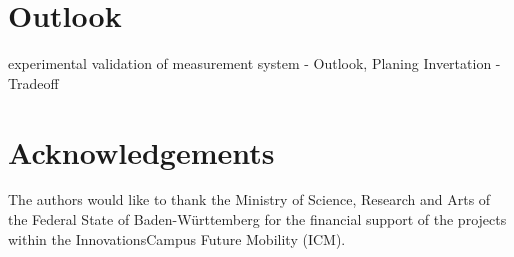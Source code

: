 \documentclass[5p,times,procedia]{elsarticle}
\begin{document}
\section{Outlook}
experimental validation of measurement system
- Outlook, Planing Invertation
- Tradeoff



%

\section*{Acknowledgements}
The authors would like to thank the Ministry of Science, Research and Arts of the Federal State of Baden-Württemberg for the financial support of the projects within the InnovationsCampus Future Mobility (ICM).








\end{document}
